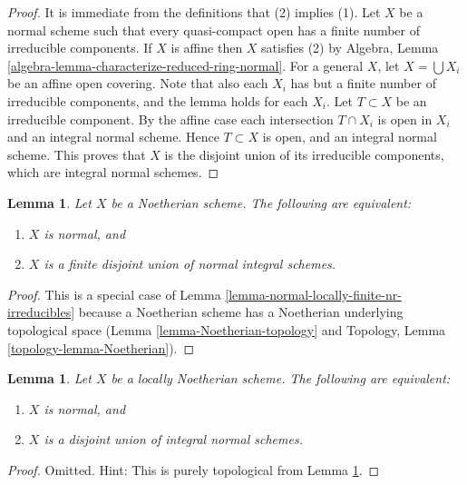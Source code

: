 \documentclass{stacks-project}
\theoremstyle{plain}
\newtheorem{lemma}[subsection]{Lemma}
\theoremstyle{definition}
\theoremstyle{remark}
\numberwithin{equation}{subsection}
\begin{document}
\begin{proof}
It is immediate from the definitions that (2) implies (1).
Let $X$ be a normal scheme such that every quasi-compact open
has a finite number of irreducible components.
If $X$ is affine then $X$ satisfies (2) by
Algebra, Lemma \ref{algebra-lemma-characterize-reduced-ring-normal}.
For a general $X$, let $X = \bigcup X_i$ be
an affine open covering. Note that also each $X_i$ has
but a finite number of irreducible components, and the lemma holds
for each $X_i$. Let $T \subset X$ be an irreducible component.
By the affine case each intersection $T \cap X_i$ is open in $X_i$
and an integral normal scheme.
Hence $T \subset X$ is open, and an integral normal scheme.
This proves that $X$ is the disjoint union of its irreducible components,
which are integral normal schemes.
\end{proof}

\begin{lemma}
\label{lemma-normal-Noetherian}
Let $X$ be a Noetherian scheme.
The following are equivalent:
\begin{enumerate}
\item $X$ is normal, and
\item $X$ is a finite disjoint union of normal integral schemes.
\end{enumerate}
\end{lemma}

\begin{proof}
This is a special case of
Lemma \ref{lemma-normal-locally-finite-nr-irreducibles} because a Noetherian
scheme has a Noetherian underlying topological space
(Lemma \ref{lemma-Noetherian-topology}
and
Topology, Lemma \ref{topology-lemma-Noetherian}).
\end{proof}

\begin{lemma}
\label{lemma-normal-locally-Noetherian}
Let $X$ be a locally Noetherian scheme.
The following are equivalent:
\begin{enumerate}
\item $X$ is normal, and
\item $X$ is a disjoint union of integral normal schemes.
\end{enumerate}
\end{lemma}

\begin{proof}
Omitted. Hint: This is purely topological from
Lemma \ref{lemma-normal-Noetherian}.
\end{proof}
\end{document}
